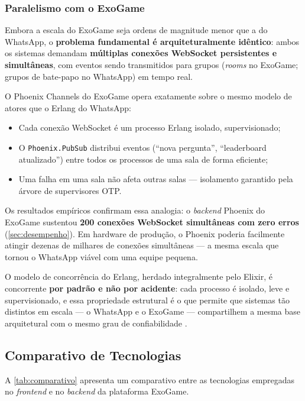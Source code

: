 \documentclass[
	12pt,
	openany,
	oneside,
	a4paper,
	english,
	brazil
]{abntex2}
\begin{document}
\subsubsection{Paralelismo com o ExoGame}

Embora a escala do ExoGame seja ordens de magnitude menor que a do WhatsApp, o \textbf{problema fundamental é arquiteturalmente idêntico}: ambos os sistemas demandam \textbf{múltiplas conexões WebSocket persistentes e simultâneas}, com eventos sendo transmitidos para grupos (\textit{rooms} no ExoGame; grupos de bate-papo no WhatsApp) em tempo real.

O Phoenix Channels do ExoGame opera exatamente sobre o mesmo modelo de atores que o Erlang do WhatsApp:

\begin{itemize}
  \item Cada conexão WebSocket é um processo Erlang isolado, supervisionado;
  \item O \texttt{Phoenix.PubSub} distribui eventos (``nova pergunta'', ``leaderboard atualizado'') entre todos os processos de uma sala de forma eficiente;
  \item Uma falha em uma sala não afeta outras salas --- isolamento garantido pela árvore de supervisores OTP.
\end{itemize}

Os resultados empíricos confirmam essa analogia: o \textit{backend} Phoenix do ExoGame sustentou \textbf{200 conexões WebSocket simultâneas com zero erros} (\autoref{sec:desempenho}). Em hardware de produção, o Phoenix poderia facilmente atingir dezenas de milhares de conexões simultâneas --- a mesma escala que tornou o WhatsApp viável com uma equipe pequena.

O modelo de concorrência do Erlang, herdado integralmente pelo Elixir, é concorrente \textbf{por padrão e não por acidente}: cada processo é isolado, leve e supervisionado, e essa propriedade estrutural é o que permite que sistemas tão distintos em escala --- o WhatsApp e o ExoGame --- compartilhem a mesma base arquitetural com o mesmo grau de confiabilidade \cite{armstrong2013}.

\subsection{Comparativo de Tecnologias}

A \autoref{tab:comparativo} apresenta um comparativo entre as tecnologias empregadas no \textit{frontend} e no \textit{backend} da plataforma ExoGame.
\end{document}
